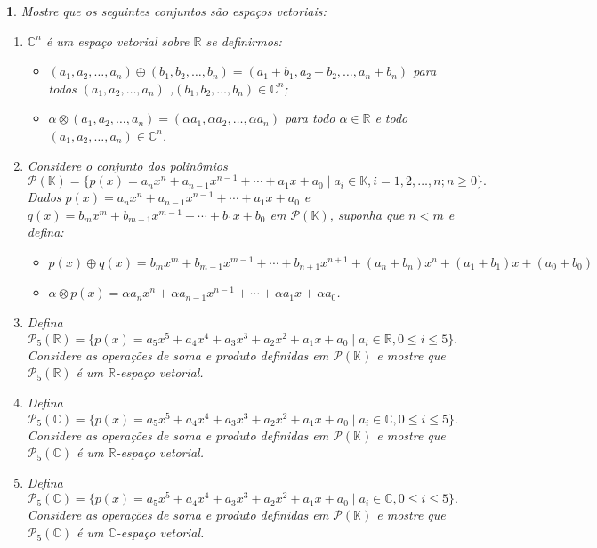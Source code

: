\documentclass[12pt]{exam}
\newtheorem{exercicio}{}
\newcommand{\real}{\mathbb{R}}
\newcommand{\complex}{\mathbb{C}}
\newcommand{\cp}[1]{\mathbb{#1}}
\begin{document}
\begin{exercicio}
  Mostre que os seguintes conjuntos s\~ao espa\c{c}os vetoriais:
  \begin{enumerate}[label={\alph*})]
    \item $\complex^n$ \'e um espa\c{c}o vetorial sobre $\real$ se definirmos:
    \begin{itemize}
      \item $(a_1, a_2, \dots, a_n) \oplus (b_1, b_2, \dots,b_n) = (a_1 + b_1, a_2 + b_2,\dots, a_n + b_n)$ para todos $(a_1, a_2, \dots,a_n)$ ,$(b_1, b_2, \dots,b_n) \in \complex^n$;
      \item $\alpha \otimes (a_1, a_2, \dots,a_n) = (\alpha a_1, \alpha a_2, \dots, \alpha a_n)$ para todo $\alpha \in \real$ e todo $(a_1, a_2, \dots, a_n) \in \complex^n$.
    \end{itemize}
    \item Considere o conjunto dos polin\^omios
    \[
      \mathcal{P}(\cp{K}) = \{ p(x) = a_nx^n + a_{n - 1}x^{n - 1} + \cdots + a_1x + a_0 \mid a_i \in \cp{K}, i = 1, 2, \dots, n; n \ge 0 \}.
    \]
    Dados $p(x) = a_nx^n + a_{n - 1}x^{n - 1} + \cdots + a_1x + a_0$ e $q(x) = b_mx^m + b_{m - 1}x^{m - 1} + \cdots + b_1x + b_0$ em $\mathcal{P}(\cp{K})$, suponha que $n < m$ e defina:
    \begin{itemize}
      \item $p(x) \oplus q(x) = b_mx^m + b_{m - 1}x^{m - 1} + \cdots + b_{n + 1}x^{n + 1} + (a_n + b_n)x^n + (a_1 + b_1)x + (a_0 + b_0)$
      \item $\alpha\otimes p(x) = \alpha a_nx^n + \alpha a_{n - 1}x^{n - 1} + \cdots + \alpha a_1x + \alpha a_0$.
    \end{itemize}

    \item Defina
    \[
      \mathcal{P}_5(\real) = \{ p(x) = a_5x^5 + a_4x^4 + a_3x^3 + a_2x^2 + a_1x + a_0 \mid a_i \in \real, 0 \le i \le 5 \}.
    \]
    Considere as opera\c{c}\~oes de soma e produto definidas em $\mathcal{P}(\cp{K})$ e mostre que $\mathcal{P}_5(\real)$ é um $\real$-espaço vetorial.

    \item Defina
    \[
      \mathcal{P}_5(\complex) = \{ p(x) = a_5x^5 + a_4x^4 + a_3x^3 + a_2x^2 + a_1x + a_0 \mid a_i \in \complex, 0 \le i \le 5 \}.
    \]
    Considere as opera\c{c}\~oes de soma e produto definidas em $\mathcal{P}(\cp{K})$ e mostre que $\mathcal{P}_5(\complex)$ é um $\real$-espaço vetorial.

    \item Defina
    \[
      \mathcal{P}_5(\complex) = \{ p(x) = a_5x^5 + a_4x^4 + a_3x^3 + a_2x^2 + a_1x + a_0 \mid a_i \in \complex, 0 \le i \le 5 \}.
    \]
    Considere as opera\c{c}\~oes de soma e produto definidas em $\mathcal{P}(\cp{K})$ e mostre que $\mathcal{P}_5(\complex)$ é um $\complex$-espaço vetorial.


\end{enumerate}
\end{exercicio}
\end{document}
